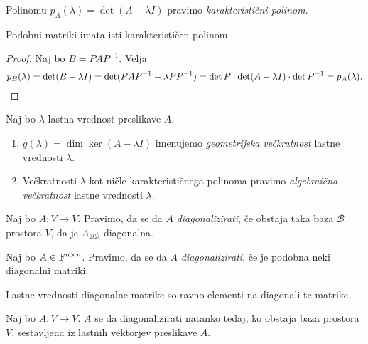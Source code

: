 \documentclass[12pt, a4paper]{article}
\begin{document}
\begin{definicija}
Polinomu $p_A(\lambda)=\det(A-\lambda I)$ pravimo \emph{karakteristični polinom}.
\end{definicija}

\begin{trditev}
Podobni matriki imata isti karakterističen polinom.
\end{trditev}

\begin{proof}
Naj bo $B=PAP^{-1}$. Velja
\[
p_B(\lambda)=\det(B-\lambda I)=\det(PAP^{-1}-\lambda PP^{-1})=\det P\cdot \det(A-\lambda I)\cdot\det P^{-1}=p_A(\lambda).\qedhere
\]
\end{proof}

\begin{definicija}
Naj bo $\lambda$ lastna vrednost preslikave $A$.
\begin{enumerate}[label=\roman*)]
\item $g(\lambda)=\dim\ker(A-\lambda I)$ imenujemo \emph{geometrijska večkratnost} lastne vrednosti $\lambda$.
\item Večkratnosti $\lambda$ kot ničle karakterističnega polinoma pravimo \emph{algebraična večkratnost} lastne vrednosti $\lambda$.
\end{enumerate}
\end{definicija}

\begin{definicija}
Naj bo $A\colon V\to V$. Pravimo, da se da $A$ \emph{diagonalizirati}, če obstaja taka baza $\mathcal{B}$ prostora $V$, da je $A_{\mathcal{BB}}$ diagonalna.

Naj bo $A\in\mathbb{F}^{n\times n}$. Pravimo, da se da $A$ \emph{diagonalizirati}, če je podobna neki diagonalni matriki.
\end{definicija}

\begin{trditev}
Lastne vrednosti diagonalne matrike so ravno elementi na diagonali te matrike.
\end{trditev}

\obvs

\begin{izrek}
Naj bo $A\colon V\to V$. $A$ se da diagonalizirati natanko tedaj, ko obstaja baza prostora $V$, sestavljena iz lastnih vektorjev preslikave $A$.
\end{izrek}

\obvs
\end{document}
